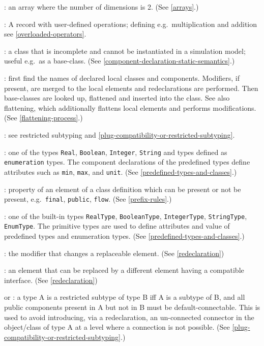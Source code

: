 : an array where the number of dimensions is 2. (See
\cref{arrays}.)

: A record with user-defined operations;
defining e.g.\ multiplication and addition see \cref{overloaded-operators}.

: a class that is incomplete and cannot be instantiated
in a simulation model; useful e.g.\ as a base-class. (See \cref{component-declaration-static-semantics}.)

: first find the names of declared local
classes and components. Modifiers, if present, are merged to the local
elements and redeclarations are performed. Then base-classes are looked
up, flattened and inserted into the class. See also flattening, which
additionally flattens local elements and performs modifications. (See
\cref{flattening-process}.)

: see restricted subtyping and \cref{plug-compatibility-or-restricted-subtyping}.

: one of the types \lstinline!Real!, \lstinline!Boolean!, \lstinline!Integer!,
\lstinline!String! and types defined as \lstinline!enumeration! types. The component
declarations of the predefined types define attributes such as \lstinline!min!, \lstinline!max!,
and \lstinline!unit!. (See \cref{predefined-types-and-classes}.)

: property of an element of a class definition which can
be present or not be present, e.g.\ \lstinline!final!, \lstinline!public!, \lstinline!flow!. (See \cref{prefix-rules}.)

: one of the built-in types \lstinline!RealType!,
\lstinline!BooleanType!, \lstinline!IntegerType!, \lstinline!StringType!, \lstinline!EnumType!. The primitive types are
used to define attributes and value of predefined types and enumeration
types. (See \cref{predefined-types-and-classes}.)

: the modifier that changes a replaceable element.
(See \cref{redeclaration})

: an element that can be replaced by a different
element having a compatible interface. (See \cref{redeclaration})

 or : a type A
is a restricted subtype of type B iff A is a subtype of B, and all
public components present in A but not in B must be default-connectable.
This is used to avoid introducing, via a redeclaration, an un-connected
connector in the object/class of type A at a level where a connection is
not possible. (See \cref{plug-compatibility-or-restricted-subtyping}.)

